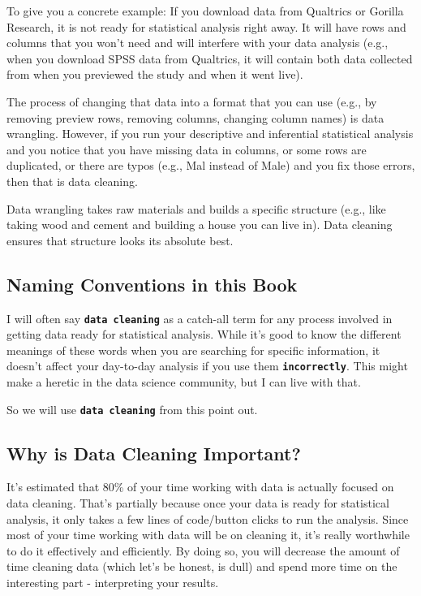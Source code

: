 \documentclass[
]{book}
\begin{document}
To give you a concrete example: If you download data from Qualtrics or Gorilla Research, it is not ready for statistical analysis right away. It will have rows and columns that you won't need and will interfere with your data analysis (e.g., when you download SPSS data from Qualtrics, it will contain both data collected from when you previewed the study and when it went live).

The process of changing that data into a format that you can use (e.g., by removing preview rows, removing columns, changing column names) is data wrangling. However, if you run your descriptive and inferential statistical analysis and you notice that you have missing data in columns, or some rows are duplicated, or there are typos (e.g., Mal instead of Male) and you fix those errors, then that is data cleaning.

Data wrangling takes raw materials and builds a specific structure (e.g., like taking wood and cement and building a house you can live in). Data cleaning ensures that structure looks its absolute best.

\subsection{\texorpdfstring{\textbf{Naming Conventions in this Book}}{Naming Conventions in this Book}}\label{naming-conventions-in-this-book}

I will often say \textbf{\texttt{data\ cleaning}} as a catch-all term for any process involved in getting data ready for statistical analysis. While it's good to know the different meanings of these words when you are searching for specific information, it doesn't affect your day-to-day analysis if you use them \textbf{\texttt{incorrectly}}. This might make a heretic in the data science community, but I can live with that.

So we will use \textbf{\texttt{data\ cleaning}} from this point out.

\subsection{\texorpdfstring{\textbf{Why is Data Cleaning Important?}}{Why is Data Cleaning Important?}}\label{why-is-data-cleaning-important}

It's estimated that 80\% of your time working with data is actually focused on data cleaning. That's partially because once your data is ready for statistical analysis, it only takes a few lines of code/button clicks to run the analysis. Since most of your time working with data will be on cleaning it, it's really worthwhile to do it effectively and efficiently. By doing so, you will decrease the amount of time cleaning data (which let's be honest, is dull) and spend more time on the interesting part - interpreting your results.
\end{document}
